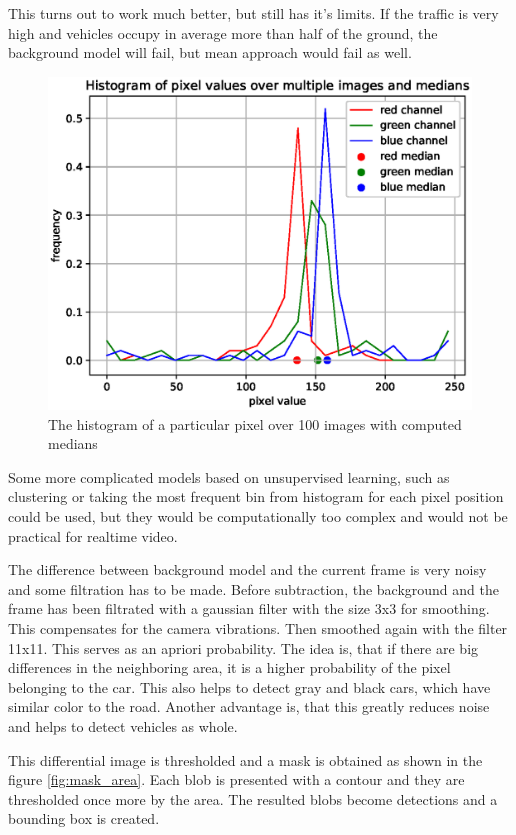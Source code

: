 \documentclass[a4paper,12pt,titlepage, twoside]{article}
\numberwithin{figure}{section}
\begin{document}
This turns out to work much better, but still has it's limits. If the traffic is very high and vehicles occupy in average more than half of the ground, the background model will fail, but mean approach would fail as well. 

\begin{figure}[h]
\centering
\includegraphics[width=1\linewidth]{fig/pixel_hist.eps}
\caption{The histogram of a particular pixel over 100 images with computed medians}
\label{fig:pixel_hist}
\end{figure}

Some more complicated models based on unsupervised learning, such as clustering or taking the most frequent bin from histogram for each pixel position could be used, but they would be computationally too complex and would not be practical for realtime video.

The difference between background model and the current frame is very noisy and some filtration has to be made. Before subtraction, the background and the frame has been filtrated with a gaussian filter with the size 3x3 for smoothing. This compensates for the camera vibrations. Then smoothed again with the filter 11x11. This serves as an apriori probability. The idea is, that if there are big differences in the neighboring area, it is a higher probability of the pixel belonging to the car. This also helps to detect gray and black cars, which have similar color to the road. Another advantage is, that this greatly reduces noise and helps to detect vehicles as whole.

This differential image is thresholded and a mask is obtained as shown in the figure \ref{fig:mask_area}. Each blob is presented with a contour and they are thresholded once more by the area. The resulted blobs become detections and a bounding box is created.
\end{document}
